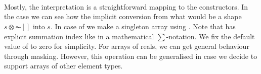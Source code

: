 \begin{code}
%
\>[24]\AgdaSpace{}%
\AgdaSpace{}%
\AgdaSpace{}%
%
\>[33]\AgdaSymbol{=}\AgdaSpace{}%
\AgdaSpace{}%
\AgdaOperator{\AgdaField{\AgdaUnderscore{}*\AgdaUnderscore{}}}\AgdaSpace{}%
\AgdaSpace{}%
\AgdaSpace{}%
\AgdaSpace{}%
\AgdaSpace{}%
\AgdaSpace{}%
\<%
\\
%
\>[2]\AgdaSpace{}%
\AgdaSpace{}%
\AgdaSpace{}%
%
\>[24]\AgdaSpace{}%
\AgdaSpace{}%
\AgdaSpace{}%
%
\>[33]\AgdaSymbol{=}\AgdaSpace{}%
\AgdaSpace{}%
\AgdaSymbol{(}\AgdaSpace{}%
\AgdaSpace{}%
\AgdaSymbol{)}\AgdaSpace{}%
\AgdaSpace{}%
\AgdaSpace{}%
\<%
\\
%
\>[2]\AgdaSpace{}%
\AgdaSpace{}%
%
\>[24]\AgdaSpace{}%
\AgdaSpace{}%
\AgdaSpace{}%
%
\>[33]\AgdaSymbol{=}\AgdaSpace{}%
\AgdaSpace{}%
\AgdaOperator{\AgdaField{-\AgdaUnderscore{}}}\AgdaSpace{}%
\AgdaSpace{}%
\AgdaSpace{}%
\<%
\\
%
\>[2]\AgdaSpace{}%
\AgdaSpace{}%
\AgdaSpace{}%
%
\>[24]\AgdaSpace{}%
\AgdaSpace{}%
\AgdaSpace{}%
%
\>[33]\AgdaSymbol{=}\AgdaSpace{}%
\AgdaSpace{}%
\AgdaSpace{}%
\AgdaSpace{}%
\AgdaSpace{}%
\AgdaSpace{}%
\AgdaOperator{\AgdaInductiveConstructor{,}}\AgdaSpace{}%
\AgdaSpace{}%
\AgdaSpace{}%
\AgdaSpace{}%
\<%
\end{code}
Mostly, the interpretation is a straightforward mapping to the  constructors.
In the  case we can see how the implicit conversion from what would be a
shape $s ⊗ \AC{[]}$ into $s$.  In case of  we make a singleton array
using . Note that  has explicit summation index like in a mathematical
$\sum$-notation.  We fix the default value of  to zero for simplicity.
For arrays of reals, we can get general  behaviour through masking.
However, this operation can be generalised in case we decide to support arrays of
other element types.


